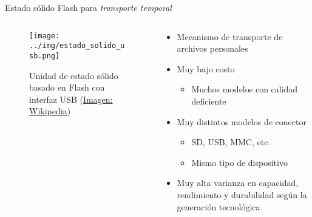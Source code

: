 \documentclass[presentation]{beamer}
\begin{document}
\begin{frame}[label={sec:org9e9b710}]{Estado sólido Flash para \emph{transporte temporal}}
\begin{columns} \begin{column}{0.4\textwidth}
\begin{figure}[htbp]
\centering
\texttt{[image: ../img/estado\_solido\_usb.png]}
\caption{Unidad de estado sólido basado en Flash con interfaz USB (\href{https://en.wikipedia.org/wiki/Solid-state\\\_drive}{Imagen: Wikipedia})}
\end{figure}
\end{column} \begin{column}{0.6\textwidth}
\begin{itemize}
\item Mecanismo de transporte de archivos personales
\item Muy bajo costo
\begin{itemize}
\item Muchos modelos con calidad deficiente
\end{itemize}
\item Muy distintos modelos de conector
\begin{itemize}
\item SD, USB, MMC, etc.
\item Mismo tipo de dispositivo
\end{itemize}
\item Muy alta varianza en capacidad, rendimiento y durabilidad según la
generación tecnológica
\end{itemize}
\end{column} \end{columns}
\end{frame}
\end{document}
